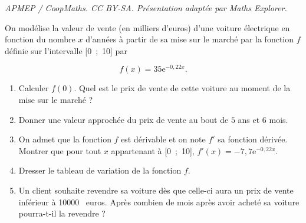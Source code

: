 \documentclass[10pt]{article}
\providecommand{\e}{{\mathrm{e}}}
\providecommand{\np}[2][]{{#2~#1}}
\begin{document}
\noindent\textit{APMEP / CoopMaths. CC BY-SA. Présentation adaptée par Maths Explorer.}\par\medskip
\medskip

On modélise la valeur de vente (en milliers d'euros) d'une voiture électrique en fonction du
nombre $x$ d'années à partir de sa mise sur le marché par la fonction $f$ définie sur l'intervalle
[0~;~10] par

\[f(x) = 35\e^{-0,22x} .\]

\smallskip
\begin{enumerate}
\item Calculer $f(0)$. Quel est le prix de vente de cette voiture au moment de la mise sur le
marché ?
\item Donner une valeur approchée du prix de vente au bout de $5$ ans et $6$ mois.
\item On admet que la fonction $f$ est dérivable et on note $f'$ sa fonction dérivée. Montrer
que pour tout $x$ appartenant à [0~;~10], $f'(x) = - 7,7\e^{- 0,22x}$.
\item Dresser le tableau de variation de la fonction $f$.
\item Un client souhaite revendre sa voiture dès que celle-ci aura un prix de vente inférieur
à \np{10000} euros. Après combien de mois après avoir acheté sa voiture pourra-t-il la
revendre ?
\end{enumerate}
\end{document}
